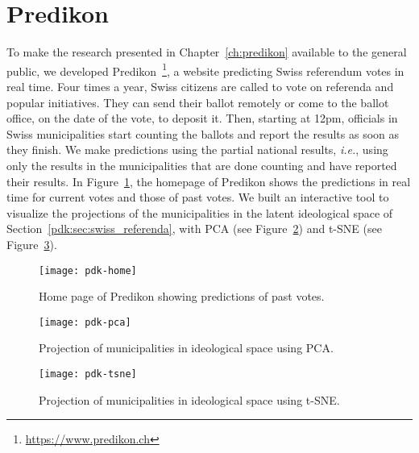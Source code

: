 \section{Predikon}
\label{app:sec:predikon}

To make the research presented in Chapter~\ref{ch:predikon} available to the general public, we developed Predikon~\footnote{\href{https://www.predikon.ch}{https://www.predikon.ch}}, a website predicting Swiss referendum votes in real time.
Four times a year, Swiss citizens are called to vote on referenda and popular initiatives.
They can send their ballot remotely or come to the ballot office, on the date of the vote, to deposit it.
Then, starting at 12pm, officials in Swiss municipalities start counting the ballots and report the results as soon as they finish.
We make predictions using the partial national results, \textit{i.e.}, using only the results in the municipalities that are done counting and have reported their results.
In Figure~\ref{app:fig:predikonhome}, the homepage of Predikon shows the predictions in real time for current votes and those of past votes.
We built an interactive tool to visualize the projections of the municipalities in the latent ideological space of Section~\ref{pdk:sec:swiss_referenda}, with PCA (see Figure~\ref{app:fig:predikonpca}) and t-SNE (see Figure~\ref{app:fig:predikontsne}).

\begin{figure}
	\centering
	\texttt{[image: pdk-home]}
	\caption{Home page of Predikon showing predictions of past votes.}
	\label{app:fig:predikonhome}
\end{figure}

\begin{figure}
	\centering
	\texttt{[image: pdk-pca]}
	\caption{Projection of municipalities in ideological space using PCA.}
	\label{app:fig:predikonpca}
\end{figure}

\begin{figure}
	\centering
	\texttt{[image: pdk-tsne]}
	\caption{Projection of municipalities in ideological space using t-SNE.}
	\label{app:fig:predikontsne}
\end{figure}
